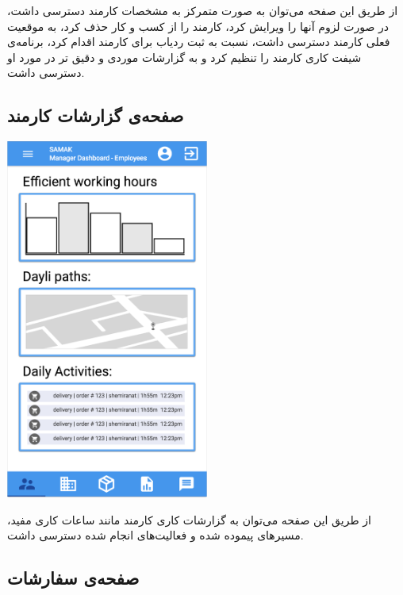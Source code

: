 از طریق این صفحه می‌توان به صورت متمرکز به مشخصات کارمند دسترسی داشت، در صورت لزوم آنها را ویرایش کرد، کارمند را از کسب و کار حذف کرد، به موقعیت فعلی کارمند دسترسی داشت، نسبت به ثبت ردیاب برای کارمند اقدام کرد، برنامه‌ی شیفت کاری کارمند را تنظیم کرد و به گزارشات موردی و دقیق تر در مورد او دسترسی داشت.




\subsection{صفحه‌ی گزارشات کارمند}
\begin{center}
\includegraphics[width = 0.5\textwidth]{images/12-employee-reports.png}
\end{center}


از طریق این صفحه می‌توان به گزارشات کاری کارمند مانند ساعات کاری مفید، مسیر‌های پیموده شده و فعالیت‌های انجام شده دسترسی داشت.


\subsection{صفحه‌ی سفارشات}


